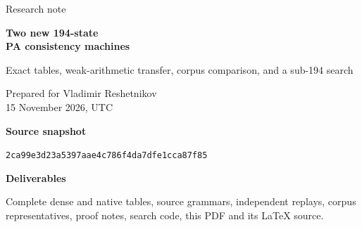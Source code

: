 \documentclass[11pt,letterpaper]{article}
\begin{document}
\begin{titlepage}
\vspace*{0.45in}
{\Large\sffamily Research note}\par\vspace{0.25in}
{\Huge\bfseries Two new 194-state\\[0.12em] PA consistency machines}\par\vspace{0.2in}
{\Large Exact tables, weak-arithmetic transfer, corpus comparison, and a sub-194 search}\par\vspace{0.4in}
Prepared for Vladimir Reshetnikov\\
15 November 2026, UTC
\vspace{0.45in}
\begin{abstract}
No valid blank-start machine with fewer than 194 working states was obtained. The principal fallback is PA194AX11HC4, a new physical implementation of the calibrated AX11H source. It has 194 working states and 388 binary transitions. A four-cycle in the placement of registers changes six selector rows, all exercised during initialization. Its exact blank startup takes 57,406 steps, and all 4,778 symbolic source outcomes pass. The source program and arithmetic blocks are unchanged. A positive-duration simulation transfers the supplied written iPRA calibration to this literal table. A companion, PA194C32, preserves the original primary PA194 source, changes seven selector rows, passes all 4,780 outcomes, and initializes in 56,250 steps.

The fresh comparison recognizes 526 spanning 194-state table classes in the six current incoming archives, including all 139 historical catalog classes. Both new tables are distinct from that corpus under control renaming, choice of root, reflection, bit exchange, and ignored halt-entry decorations. These are new concrete register allocations within an existing method, not a new logical calculus. A new two-edit bootstrap screen for a 193-state runtime core tests 22,575,210 blank starts without finding a complete source frame within its stated bounds. A separate source-compression experiment shortens the axiom word to 189 macro tokens but compiles to 196 states.

The iPRA result is an ordinary mathematical transfer from the supplied written AX11H calibration. This release does not claim a completed end-to-end Lean or Rocq proof.
\end{abstract}
\vfill
\textbf{Source snapshot}\par
\texttt{2ca99e3d23a5397aae4c786f4da7dfe1cca87f85}\par
\textbf{Deliverables}\par
Complete dense and native tables, source grammars, independent replays, corpus representatives, proof notes, search code, this PDF and its LaTeX source.
\end{titlepage}
\tableofcontents
\newpage
\end{document}
